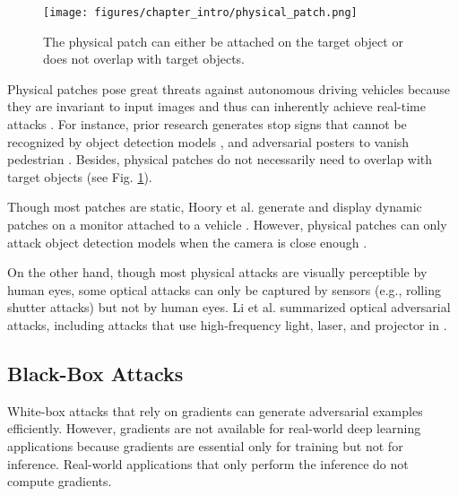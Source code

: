 \begin{figure}[H]
\centering
\texttt{[image: figures/chapter\_intro/physical\_patch.png]}
\caption{The physical patch can either be attached on the target object or does not overlap with target objects.}
\label{fig.physical_patch_overlap}
\end{figure}

Physical patches pose great threats against autonomous driving vehicles because they are invariant to input images and thus can inherently achieve real-time attacks \citep{threet2021physical}. For instance, prior research generates stop signs that cannot be recognized by object detection models \citep{song2018physical} \citep{chen2019shapeshifter}, and adversarial posters to vanish pedestrian \citep{thys2019fooling, wang2021towards}. Besides, physical patches do not necessarily need to overlap with target objects (see Fig. \ref{fig.physical_patch_overlap}).

Though most patches are static, Hoory et al. generate and display dynamic patches on a monitor attached to a vehicle \citep{hoory2020dynamic}. However, physical patches can only attack object detection models when the camera is close enough \citep{wang2021daedalus, lu2021scale}.

On the other hand, though most physical attacks are visually perceptible by human eyes, some optical attacks can only be captured by sensors (e.g., rolling shutter attacks) but not by human eyes. Li et al. summarized optical adversarial attacks, including attacks that use high-frequency light, laser, and projector in \citep{li2022survey}.



\subsection{Black-Box Attacks}
\label{sec:blackbox_attack}

White-box attacks that rely on gradients can generate adversarial examples efficiently. However, gradients are not available for real-world deep learning applications because gradients are essential only for training but not for inference. Real-world applications that only perform the inference do not compute gradients. 


